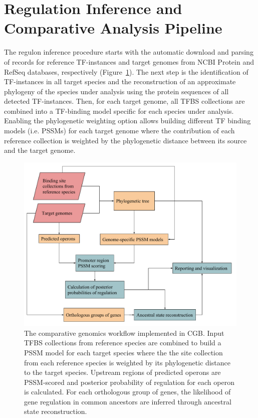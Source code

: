 \section{Regulation Inference and Comparative Analysis Pipeline}

The regulon inference procedure starts with the automatic download and parsing
of records for reference TF-instances and target genomes from NCBI Protein and
RefSeq databases, respectively (Figure~\ref{fig:pipeline}). The next step is
the identification of TF-instances in all target species and the reconstruction
of an approximate phylogeny of the species under analysis using the protein
sequences of all detected TF-instances. Then, for each target genome, all TFBS
collections are combined into a TF-binding model specific for each species
under analysis. Enabling the phylogenetic weighting option allows building
different TF binding models (i.e. PSSMs) for each target genome where the
contribution of each reference collection is weighted by the phylogenetic
distance between its source and the target genome.

\begin{figure}
  \centering
  \includegraphics[width=\textwidth]{figures/chapter4/cgb_workflow}
  \caption{The comparative genomics workflow implemented in CGB\@. Input TFBS
    collections from reference species are combined to build a PSSM model for
    each target species where the the site collection from each reference
    species is weighted by its phylogenetic distance to the target
    species. Upstream regions of predicted operons are PSSM-scored and
    posterior probability of regulation for each operon is calculated. For each
    orthologous group of genes, the likelihood of gene regulation in common
    ancestors are inferred through ancestral state reconstruction.}
  \label{fig:pipeline}
\end{figure}

